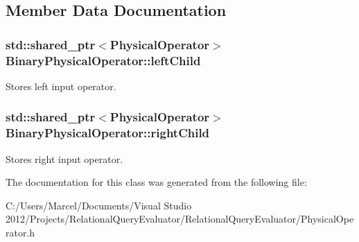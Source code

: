 \subsection{Member Data Documentation}
\hypertarget{class_binary_physical_operator_a60ea09dbc34f680f024a9946c3634cbd}{
\subsubsection[{left\+Child}]{\setlength{\rightskip}{0pt plus 5cm}std\+::shared\+\_\+ptr$<${\bf Physical\+Operator}$>$ Binary\+Physical\+Operator\+::left\+Child}}\label{class_binary_physical_operator_a60ea09dbc34f680f024a9946c3634cbd}
Stores left input operator. \hypertarget{class_binary_physical_operator_a9247498cd4b4e35968e2aa78bac17016}{
\subsubsection[{right\+Child}]{\setlength{\rightskip}{0pt plus 5cm}std\+::shared\+\_\+ptr$<${\bf Physical\+Operator}$>$ Binary\+Physical\+Operator\+::right\+Child}}\label{class_binary_physical_operator_a9247498cd4b4e35968e2aa78bac17016}
Stores right input operator. 

The documentation for this class was generated from the following file\+:\begin{DoxyCompactItemize}
\item 
C\+:/\+Users/\+Marcel/\+Documents/\+Visual Studio 2012/\+Projects/\+Relational\+Query\+Evaluator/\+Relational\+Query\+Evaluator/Physical\+Operator.\+h\end{DoxyCompactItemize}

